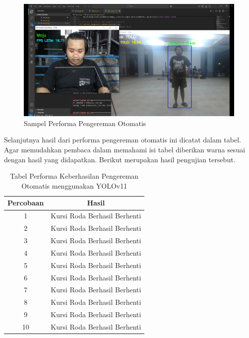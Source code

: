 \begin{figure} [H] \centering
  \includegraphics[scale=0.3]{gambar/performakeberhasilan.jpg}
  \caption{Sampel Performa Pengereman Otomatis}
  \label{fig:Fotoperforma}
\end{figure}

Selanjutnya hasil dari performa pengereman otomatis ini dicatat dalam tabel. Agar memudahkan pembaca dalam memahami isi tabel diberikan warna sesuai dengan hasil yang didapatkan. Berikut merupakan hasil pengujian tersebut.

\begin{table}[H]
  \centering
  \caption{Tabel Performa Keberhasilan Pengereman Otomatis menggunakan YOLOv11}
  \label{tb:tabelyolov11performa}
  \begin{tabular}{|c|c|}
  \hline
  Percobaan & Hasil                                                \\ \hline
  1         & \cellcolor[HTML]{34FF34}Kursi Roda Berhasil Berhenti \\ \hline
  2         & \cellcolor[HTML]{34FF34}Kursi Roda Berhasil Berhenti \\ \hline
  3         & \cellcolor[HTML]{34FF34}Kursi Roda Berhasil Berhenti \\ \hline
  4         & \cellcolor[HTML]{34FF34}Kursi Roda Berhasil Berhenti \\ \hline
  5         & \cellcolor[HTML]{34FF34}Kursi Roda Berhasil Berhenti \\ \hline
  6         & \cellcolor[HTML]{34FF34}Kursi Roda Berhasil Berhenti \\ \hline
  7         & \cellcolor[HTML]{34FF34}Kursi Roda Berhasil Berhenti \\ \hline
  8         & \cellcolor[HTML]{34FF34}Kursi Roda Berhasil Berhenti \\ \hline
  9         & \cellcolor[HTML]{34FF34}Kursi Roda Berhasil Berhenti \\ \hline
  10        & \cellcolor[HTML]{34FF34}Kursi Roda Berhasil Berhenti \\ \hline
  \end{tabular}
  \end{table}

